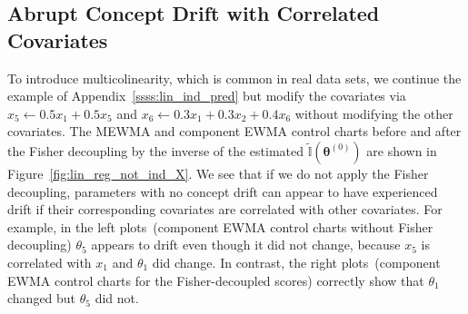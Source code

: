 \documentclass[twoside,11pt]{article}
\begin{document}
\begin{appendices}

\subsection{Abrupt Concept Drift with Correlated Covariates}
\label{ssss:lin_not_ind_pred}
To introduce multicolinearity, which is common in real data sets, we continue the example of Appendix~\ref{ssss:lin_ind_pred} but modify the covariates via $x_5 \leftarrow 0.5 x_1 + 0.5 x_5$ and $x_6 \leftarrow 0.3 x_1 + 0.3 x_2 + 0.4 x_6$ without modifying the other covariates. The MEWMA and component EWMA control charts before and after the Fisher decoupling by {the inverse of the estimated} $\widetilde{\mathbb {I}}(\bm { \theta}^{(0)})$ are shown in Figure~\ref{fig:lin_reg_not_ind_X}. We see that if we do not apply the Fisher decoupling, parameters with no concept drift can appear to have experienced drift if their corresponding covariates are correlated with other covariates. For example, in the left plots~(component EWMA control charts without Fisher decoupling) $\theta_5$ appears to drift even though it did not change, because $x_5$ is correlated with $x_1$ and $\theta_1$ did change. In contrast, the right plots~(component EWMA control charts for the Fisher-decoupled scores) correctly show that $\theta_1$ changed but $\theta_5$ did not.



\end{appendices}
\end{document}
